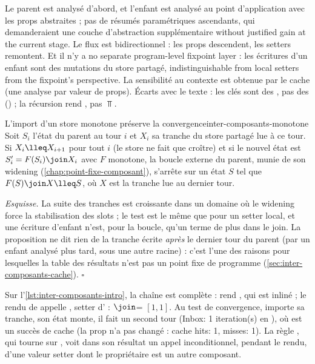 \begin{decision}
Le parent est analysé d'abord, et l'enfant est analysé au point d'application avec les props
abstraites ; pas de résumés paramétriques ascendants, qui demanderaient une couche d'abstraction
supplémentaire \og without justified gain at the current stage\fg. Le flux est bidirectionnel :
les props descendent, les setters remontent. Et il n'y a \og no separate program-level fixpoint
layer\fg{} : les écritures d'un enfant sont des mutations du store partagé,
\og indistinguishable from local setters from the fixpoint's perspective\fg. La sensibilité au
contexte est obtenue par le cache (une analyse par valeur de props). Écarts avec le texte :
les clés sont des , pas des  () ; la récursion rend
, pas $\Top$.
\end{decision}

\begin{proposition}{L'import d'un store monotone préserve la convergence}{inter-composants-monotone}
Soit $S_i$ l'état du parent au tour $i$ et $X_i$ sa tranche du store partagé lue à ce tour. Si
$X_i \lleq X_{i+1}$ pour tout $i$ (le store ne fait que croître) et si le nouvel état est
$S'_i = F(S_i) \join X_i$ avec $F$ monotone, la boucle externe du parent, munie de son widening
(\cref{chap:point-fixe-composant}), s'arrête sur un état $S$ tel que $F(S) \join X \lleq S$,
où $X$ est la tranche lue au dernier tour.
\end{proposition}

\noindent\emph{Esquisse.} La suite des tranches est croissante dans un domaine où le widening
force la stabilisation des slots ; le test  est le même que pour un
setter local, et une écriture d'enfant n'est, pour la boucle, qu'un terme de plus dans le join.
La proposition ne dit rien de la tranche écrite \emph{après} le dernier tour du parent (par un
enfant analysé plus tard, sous une autre racine) : c'est l'une des raisons pour lesquelles
la table des résultats n'est pas un point fixe de programme
(\cref{sec:inter-composants-cache}). \hfill$\square$

Sur l'\cref{lst:inter-composants-intro}, la chaîne est complète :  rend
, qui est inliné ; le rendu de  appelle , setter
d' :  $\join$= $[1,1]$. Au test de convergence,
 importe sa tranche, son état monte, il fait un second tour (\og Inbox: 1
iteration(s)\fg{} en ), où  est un succès de cache (la prop
 n'a pas changé : \og cache hits: 1, misses: 1\fg). La règle
, qui tourne sur , voit dans son résultat un appel
inconditionnel, pendant le rendu, d'une valeur setter dont le propriétaire est un autre
composant.

